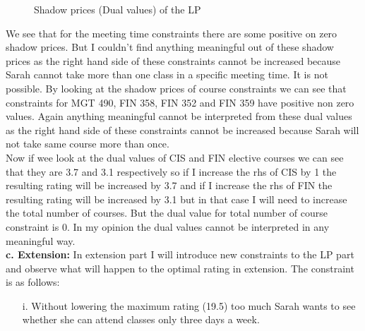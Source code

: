 \documentclass[paper=letter, fontsize=11pt]{scrartcl} %
\begin{document}
\begin{figure}[H]
  
  \centering
    \caption{Shadow prices (Dual values) of the LP}
\end{figure}
We see that for the meeting time constraints there are some positive on zero shadow prices. But I couldn't find anything meaningful out of these shadow prices as the right hand side of these constraints cannot be increased because Sarah cannot take more than one class in a specific meeting time. It is not possible. By looking at the shadow prices of course constraints we can see that constraints for MGT 490, FIN 358, FIN 352 and FIN 359 have positive non zero values. Again anything meaningful cannot be interpreted from these dual values as the right hand side of these constraints cannot be increased because Sarah will not take same course more than once.\\
Now if wee look at the dual values of CIS and FIN elective courses we can see that they are 3.7 and 3.1 respectively so if I increase the rhs of CIS by 1 the resulting rating will be increased by 3.7 and if I increase the rhs of FIN the resulting rating will be increased by 3.1 but in that case I will need to increase the total number of courses. But the dual value for total number of course constraint is 0. In my opinion the dual values cannot be interpreted in any meaningful way.\\  

 \normalsize \textbf{c. Extension:}
In extension part I will introduce new constraints to the LP part and observe what will happen to the optimal rating in extension. The constraint is as follows:
\begin{enumerate}[align=left,style=nextline,leftmargin=1.5cm,labelsep=\parindent,font=\normalfont]
\item[i.]  Without lowering the maximum rating (19.5) too much Sarah wants to see whether she can attend classes only three days a week. 
\end{enumerate}
\end{document}
